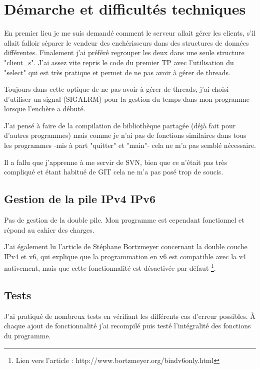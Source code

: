 \section{Démarche et difficultés techniques}

En premier lieu je me suis demandé comment le serveur allait gérer les clients, 
s'il allait falloir séparer le vendeur des enchérisseurs dans des structures de données différentes. 
Finalement j'ai préféré regrouper les deux dans une seule structure "client\_s". 
J'ai assez vite repris le code du premier TP avec l'utilisation du "select" qui est 
très pratique et permet de ne pas avoir à gérer de threads.

Toujours dans cette optique de ne pas avoir à gérer de threads, j'ai choisi d'utiliser un signal (SIGALRM)
pour la gestion du temps dans mon programme lorsque l'enchère a débuté.

J'ai pensé à faire de la compilation de bibliothèque partagée (déjà fait pour d'autres programmes) mais comme je n'ai
pas de fonctions similaires dans tous les programmes -mis à part "quitter" et "main"- cela ne m'a pas semblé nécessaire.

Il a fallu que j'apprenne à me servir de SVN, bien que ce n'était pas très compliqué et 
étant habitué de GIT cela ne m'a pas posé trop de soucis.

\subsection{Gestion de la pile IPv4 IPv6}

Pas de gestion de la double pile.
Mon programme est cependant fonctionnel et répond au cahier des charges.

J'ai également lu l'article de Stéphane Bortzmeyer \cite{BORTZMEYER} 
concernant la double couche IPv4 et v6, 
qui explique que la programmation en v6 est compatible avec la v4 nativement, 
mais que cette fonctionnalité est désactivée par défaut
\protect\footnote{ Lien vers l'article : http://www.bortzmeyer.org/bindv6only.html }.

\subsection{Tests}

J'ai pratiqué de nombreux tests en vérifiant les différents cas d'erreur possibles.
À chaque ajout de fonctionnalité j'ai recompilé puis testé 
l'intégralité des fonctions du programme.


